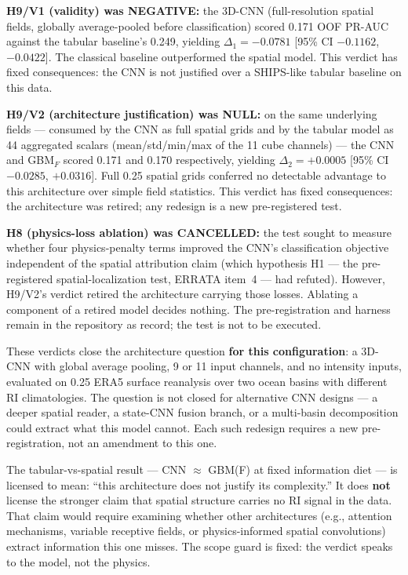 \documentclass[11pt]{article}
\begin{document}
\textbf{H9/V1 (validity) was NEGATIVE:} the 3D-CNN (full-resolution spatial
fields, globally average-pooled before classification) scored 0.171 OOF PR-AUC
against the tabular baseline's 0.249, yielding $\Delta_1 = -0.0781$ [95\% CI
$-0.1162$, $-0.0422$]. The classical baseline outperformed the spatial model.
This verdict has fixed consequences: the CNN is not justified over a SHIPS-like
tabular baseline on this data.

\textbf{H9/V2 (architecture justification) was NULL:} on the same underlying
fields --- consumed by the CNN as full spatial grids and by the tabular model
as 44 aggregated scalars (mean/std/min/max of the 11 cube channels) --- the
CNN and GBM$_F$ scored 0.171 and 0.170 respectively, yielding
$\Delta_2 = +0.0005$ [95\% CI $-0.0285$, $+0.0316$]. Full 0.25\textdegree{}
spatial grids conferred no detectable advantage to this architecture over
simple field statistics. This verdict has fixed consequences: the architecture
was retired; any redesign is a new pre-registered test.

\textbf{H8 (physics-loss ablation) was CANCELLED:} the test sought to measure
whether four physics-penalty terms improved the CNN's classification objective
independent of the spatial attribution claim (which hypothesis H1 --- the
pre-registered spatial-localization test, ERRATA item~4 --- had refuted). However,
H9/V2's verdict retired the architecture carrying those losses. Ablating a
component of a retired model decides nothing. The pre-registration and harness
remain in the repository as record; the test is not to be executed.

These verdicts close the architecture question \textbf{for this configuration}:
a 3D-CNN with global average pooling, 9 or 11 input channels, and no intensity
inputs, evaluated on 0.25\textdegree{} ERA5 surface reanalysis over two ocean
basins with different RI climatologies. The question is not closed for
alternative CNN designs --- a deeper spatial reader, a state-CNN fusion branch,
or a multi-basin decomposition could extract what this model cannot. Each such
redesign requires a new pre-registration, not an amendment to this one.

The tabular-vs-spatial result --- CNN $\approx$ GBM(F) at fixed information
diet --- is licensed to mean: ``this architecture does not justify its
complexity.'' It does \textbf{not} license the stronger claim that spatial
structure carries no RI signal in the data. That claim would require examining
whether other architectures (e.g., attention mechanisms, variable receptive
fields, or physics-informed spatial convolutions) extract information this one
misses. The scope guard is fixed: the verdict speaks to the model, not the
physics.
\end{document}
